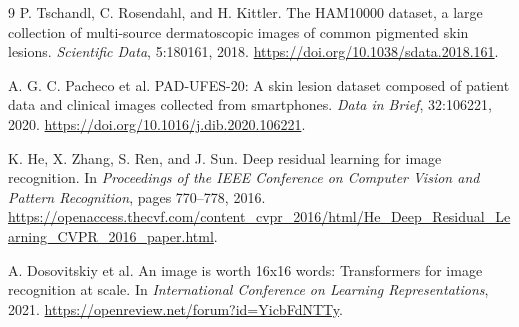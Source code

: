 \documentclass[11pt]{article}
\begin{document}
\begin{thebibliography}{9}
P. Tschandl, C. Rosendahl, and H. Kittler.
\newblock The HAM10000 dataset, a large collection of multi-source dermatoscopic images of common pigmented skin lesions.
\newblock \emph{Scientific Data}, 5:180161, 2018.
\newblock \url{https://doi.org/10.1038/sdata.2018.161}.

A. G. C. Pacheco et al.
\newblock PAD-UFES-20: A skin lesion dataset composed of patient data and clinical images collected from smartphones.
\newblock \emph{Data in Brief}, 32:106221, 2020.
\newblock \url{https://doi.org/10.1016/j.dib.2020.106221}.

K. He, X. Zhang, S. Ren, and J. Sun.
\newblock Deep residual learning for image recognition.
\newblock In \emph{Proceedings of the IEEE Conference on Computer Vision and Pattern Recognition}, pages 770--778, 2016.
\newblock \url{https://openaccess.thecvf.com/content_cvpr_2016/html/He_Deep_Residual_Learning_CVPR_2016_paper.html}.

A. Dosovitskiy et al.
\newblock An image is worth 16x16 words: Transformers for image recognition at scale.
\newblock In \emph{International Conference on Learning Representations}, 2021.
\newblock \url{https://openreview.net/forum?id=YicbFdNTTy}.
\end{thebibliography}
\end{document}
